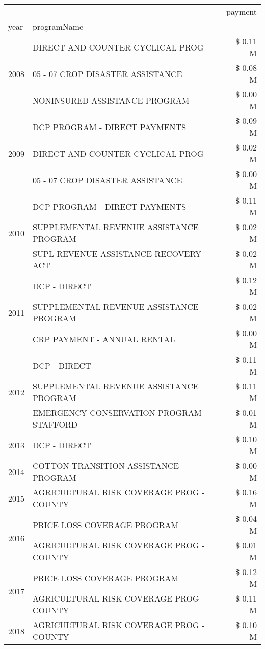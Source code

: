 \begin{tabular}{llr}
\toprule
 &  & payment \\
year & programName &  \\
\midrule
\multirow[t]{3}{*}{2008} & DIRECT AND COUNTER CYCLICAL PROG & \$ 0.11 M \\
 & 05 - 07 CROP DISASTER ASSISTANCE & \$ 0.08 M \\
 & NONINSURED ASSISTANCE PROGRAM & \$ 0.00 M \\
\cline{1-3}
\multirow[t]{3}{*}{2009} & DCP PROGRAM - DIRECT PAYMENTS & \$ 0.09 M \\
 & DIRECT AND COUNTER CYCLICAL PROG & \$ 0.02 M \\
 & 05 - 07 CROP DISASTER ASSISTANCE & \$ 0.00 M \\
\cline{1-3}
\multirow[t]{3}{*}{2010} & DCP PROGRAM - DIRECT PAYMENTS & \$ 0.11 M \\
 & SUPPLEMENTAL REVENUE ASSISTANCE PROGRAM & \$ 0.02 M \\
 & SUPL REVENUE ASSISTANCE RECOVERY ACT & \$ 0.02 M \\
\cline{1-3}
\multirow[t]{3}{*}{2011} & DCP - DIRECT & \$ 0.12 M \\
 & SUPPLEMENTAL REVENUE ASSISTANCE PROGRAM & \$ 0.02 M \\
 & CRP PAYMENT - ANNUAL RENTAL & \$ 0.00 M \\
\cline{1-3}
\multirow[t]{3}{*}{2012} & DCP - DIRECT & \$ 0.11 M \\
 & SUPPLEMENTAL REVENUE ASSISTANCE PROGRAM & \$ 0.11 M \\
 & EMERGENCY CONSERVATION PROGRAM STAFFORD & \$ 0.01 M \\
\cline{1-3}
2013 & DCP - DIRECT & \$ 0.10 M \\
\cline{1-3}
2014 & COTTON TRANSITION ASSISTANCE PROGRAM & \$ 0.00 M \\
\cline{1-3}
2015 & AGRICULTURAL RISK COVERAGE PROG - COUNTY & \$ 0.16 M \\
\cline{1-3}
\multirow[t]{2}{*}{2016} & PRICE LOSS COVERAGE PROGRAM & \$ 0.04 M \\
 & AGRICULTURAL RISK COVERAGE PROG - COUNTY & \$ 0.01 M \\
\cline{1-3}
\multirow[t]{2}{*}{2017} & PRICE LOSS COVERAGE PROGRAM & \$ 0.12 M \\
 & AGRICULTURAL RISK COVERAGE PROG - COUNTY & \$ 0.11 M \\
\cline{1-3}
\multirow[t]{3}{*}{2018} & AGRICULTURAL RISK COVERAGE PROG - COUNTY & \$ 0.10 M \\

\end{tabular}
